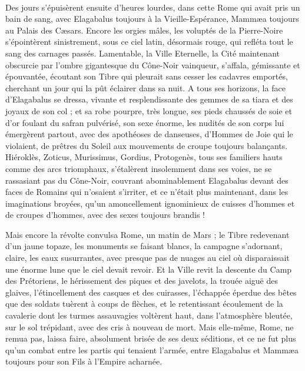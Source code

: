 \documentclass[a4paper, 11pt, oneside, polutonikogreek, french]{article}
\begin{document}
\paragraph{}
Des jours s'épuisèrent ensuite d'heures lourdes, dans cette Rome qui avait pris un bain de sang, avec Elagabalus toujours à la Vieille-Espérance, Mammæa toujours au Palais des Cæsars. Encore les orgies mâles, les voluptés de la Pierre-Noire s'épointèrent sinistrement, sous ce ciel latin, désormais rouge, qui refléta tout le sang des carnages passés. Lamentable, la Ville Eternelle, la Cité maintenant obscurcie par l'ombre gigantesque du Cône-Noir vainqueur, s'affala, gémissante et épouvantée, écoutant son Tibre qui pleurait sans cesser les cadavres emportés, cherchant un jour qui la pût éclairer dans sa nuit. A tous ses horizons, la face d'Elagabalus se dressa, vivante et resplendissante des gemmes de sa tiara et des joyaux de son col ; et sa robe pourpre, très longue, ses pieds chaussés de soie et d'or foulant du safran pulvérisé, son sexe énorme, les nudités de son corps lui émergèrent partout, avec des apothéoses de danseuses, d'Hommes de Joie qui le violaient, de prêtres du Soleil aux mouvements de croupe toujours balançants. Hiéroklès, Zoticus, Murissimus, Gordius, Protogenès, tous ses familiers hauts comme des arcs triomphaux, s'étalèrent insolemment dans ses voies, ne se rassasiant pas du Cône-Noir, couvrant abominablement Elagabalus devant des faces de Romains qui n'osaient s'irriter, et ce n'était plus maintenant, dans les imaginations broyées, qu'un amoncellement ignominieux de cuisses d'hommes et de croupes d'hommes, avec des sexes toujours brandis !

Mais encore la révolte convulsa Rome, un matin de Mars ; le Tibre redevenant d'un jaune topaze, les monuments se faisant blancs, la campagne s'adornant, claire, les eaux susurrantes, avec presque pas de nuages au ciel où disparaissait une énorme lune que le ciel devait revoir. Et la Ville revit la descente du Camp des Prétoriens, le hérissement des piques et des javelots, la trouée aiguë des glaives, l'étincellement des casques et des cuirasses, l'échappée éperdue des bêtes que des soldats tuèrent à coups de flèches, et le retentissant écoulement de la cavalerie dont les turmes assauvagies voltèrent haut, dans l'atmosphère bleutée, sur le sol trépidant, avec des cris à nouveau de mort. Mais elle-même, Rome, ne remua pas, laissa faire, absolument brisée de ses deux séditions, et ce ne fut plus qu'un combat entre les partis qui tenaient l'armée, entre Elagabalus et Mammæa toujours pour son Fils à l'Empire acharnée.
\end{document}
